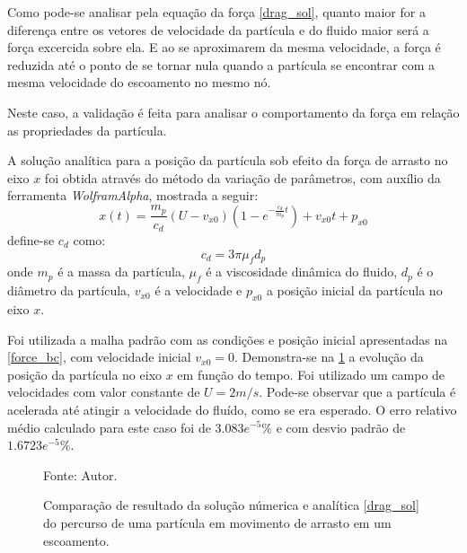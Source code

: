 Como pode-se analisar pela equação da força \eqref{drag_sol}, quanto maior for a diferença entre os vetores de velocidade da partícula e do fluido maior será a força excercida sobre ela.
E ao se aproximarem da mesma velocidade, a força é reduzida até o ponto de se tornar nula quando a partícula se encontrar com a mesma velocidade do escoamento no mesmo nó.

Neste caso, a validação é feita para analisar o comportamento da força em relação as propriedades da partícula.

A solução analítica para a posição da partícula sob efeito da força de arrasto no eixo $x$ foi obtida através do método da variação de parâmetros, com auxílio da ferramenta \textit{WolframAlpha}, mostrada a seguir:
\begin{equation}
    x(t) = \dfrac{m_p}{c_{d}} (U - v_{x0}) \left(1 - e^{-\frac{c_{d}}{m_p}t}\right) + v_{x0}t + p_{x0}
    \label{drag_sol} 
\end{equation}
define-se $c_{d}$ como:
\begin{equation}
    c_d = 3 \pi \mu_f d_p
    \label{drag_c} 
\end{equation}
onde $m_p$ é a massa da partícula, $\mu_f$ é a viscosidade dinâmica do fluido, $d_p$ é o diâmetro da partícula, $v_{x0}$ é a velocidade e $p_{x0}$ a posição inicial da partícula no eixo $x$.

Foi utilizada a malha padrão com as condições e posição inicial apresentadas na \ref{force_bc}, com velocidade inicial $v_{x0}=0$.
Demonstra-se na \ref{drag_comp} a evolução da posição da partícula no eixo $x$ em função do tempo.
Foi utilizado um campo de velocidades com valor constante de $U=2m/s$.
Pode-se observar que a partícula é acelerada até atingir a velocidade do fluído, como se era esperado.
O erro relativo médio calculado para este caso foi de $3.083e^{-5}\%$ e com desvio padrão de $1.6723e^{-5}\%$.
\begin{figure}[H]
    \centering
     {\raggedleft \scriptsize Fonte: Autor.}
    \caption{Comparação de resultado da solução númerica e analítica \ref{drag_sol} do percurso de uma partícula em movimento de arrasto em um escoamento.}
    \label{drag_comp}
\end{figure}

